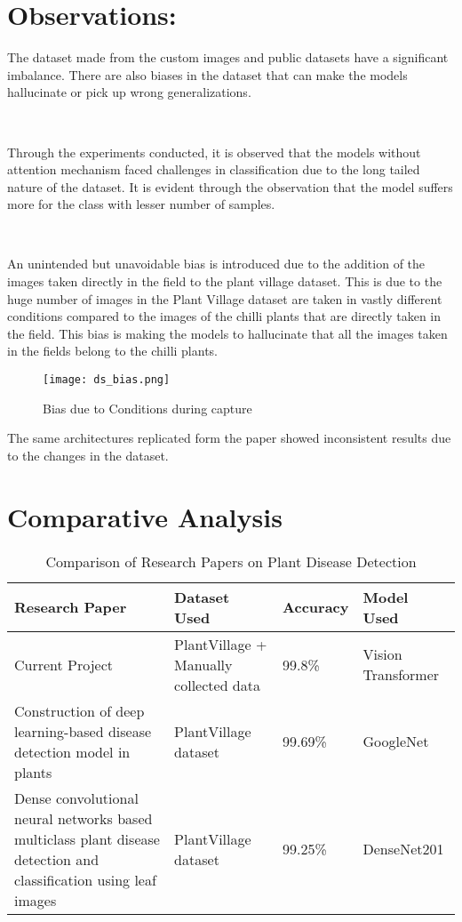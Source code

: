 \section{Observations:} 
The dataset made from the custom images and public datasets have a significant imbalance. There are also biases in the dataset that can make the models hallucinate or pick up wrong generalizations.

\

Through the experiments conducted, it is observed that the models without attention mechanism faced challenges in classification due to the long tailed nature of the dataset. It is evident through the observation that the model suffers more for the class with lesser number of samples.

\

An unintended but unavoidable bias is introduced due to the addition of the images taken directly in the field to the plant village dataset. This is due to the huge number of images in the Plant Village dataset are taken in vastly different conditions compared to the images of the chilli plants that are directly taken in the field. This bias is making the models to hallucinate that all the images taken in the fields belong to the chilli plants.

\begin{figure}[h!]
    \centering
    \texttt{[image: ds\_bias.png]}
    \caption{Bias due to Conditions during capture}
    \label{fig:ds_bias}
\end{figure}

The same architectures replicated form the paper showed inconsistent results due to the changes in the dataset.

\section{ Comparative Analysis}

\begin{table}[h!]
    \centering
    \begin{tabular}{|m{5cm}|m{4cm}|m{3cm}|m{3cm}|}
    \hline
    \textbf{Research Paper} & \textbf{Dataset Used} & \textbf{Accuracy} & \textbf{Model Used} \\ \hline
    Current Project & PlantVillage + Manually collected data & 99.8\% & Vision Transformer \\ \hline
    Construction of deep learning-based disease detection model in plants & PlantVillage dataset & 99.69\% & GoogleNet \\ \hline
    Dense convolutional neural networks based multiclass plant disease detection and classification using leaf images & PlantVillage dataset & 99.25\% & DenseNet201 \\ \hline
    \end{tabular}
    \caption{Comparison of Research Papers on Plant Disease Detection}
    \label{tab:plant_disease}
\end{table}

